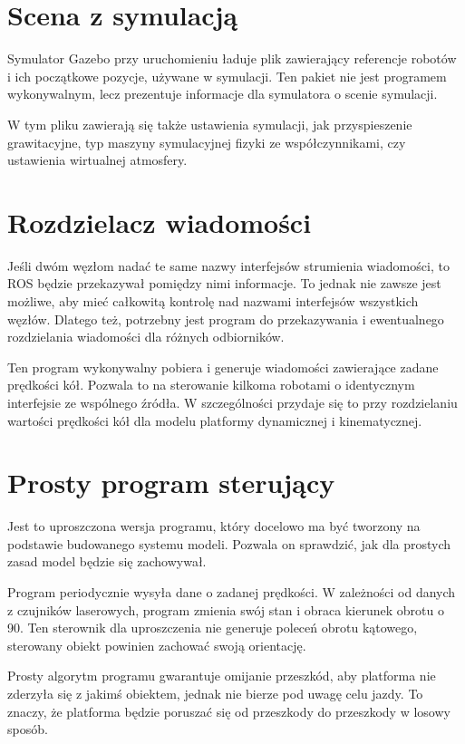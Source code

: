 \section{Scena z symulacją}
	Symulator Gazebo przy uruchomieniu ładuje plik zawierający referencje robotów i ich początkowe pozycje, używane w symulacji.
	Ten pakiet nie jest programem wykonywalnym, lecz prezentuje informacje dla symulatora o scenie symulacji.
	
	
	W tym pliku zawierają się także ustawienia symulacji, jak przyspieszenie grawitacyjne, typ maszyny symulacyjnej fizyki ze współczynnikami, czy ustawienia wirtualnej atmosfery.
	
\section{Rozdzielacz wiadomości}
	Jeśli dwóm węzłom nadać te same nazwy interfejsów strumienia wiadomości, to ROS będzie przekazywał pomiędzy nimi informacje.
	To jednak nie zawsze jest możliwe, aby mieć całkowitą kontrolę nad nazwami interfejsów wszystkich węzłów.
	Dlatego też, potrzebny jest program do przekazywania i ewentualnego rozdzielania wiadomości dla różnych odbiorników.
	
	Ten program wykonywalny pobiera i generuje wiadomości zawierające zadane prędkości kół.
	Pozwala to na sterowanie kilkoma robotami o identycznym interfejsie ze wspólnego źródła.
	W szczególności przydaje się to przy rozdzielaniu wartości prędkości kół dla modelu platformy dynamicznej i kinematycznej.
	
\section{Prosty program sterujący}
	Jest to uproszczona wersja programu, który docelowo ma być tworzony na podstawie budowanego systemu modeli.
	Pozwala on sprawdzić, jak dla prostych zasad model będzie się zachowywał.
	
	Program periodycznie wysyła dane o zadanej prędkości.
	W zależności od danych z czujników laserowych, program zmienia swój stan i obraca kierunek obrotu o 90\textdegree.
	Ten sterownik dla uproszczenia nie generuje poleceń obrotu kątowego, sterowany obiekt powinien zachować swoją orientację.
	
	Prosty algorytm programu gwarantuje omijanie przeszkód, aby platforma nie zderzyła się z jakimś obiektem, jednak nie bierze pod uwagę celu jazdy.
	To znaczy, że platforma będzie poruszać się od przeszkody do przeszkody w losowy sposób.
	

